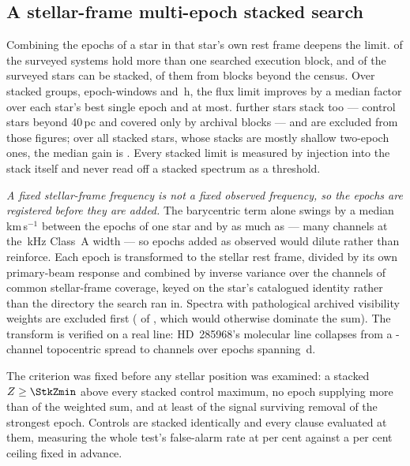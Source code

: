 \subsection{A stellar-frame multi-epoch stacked search}
\label{sec:stack}

Combining the epochs of a star in that star's own rest frame deepens the
limit. \EpMulti{} of the \NSystems{} surveyed systems hold more than one
searched execution block, and \SxStkStarCensus{} of the surveyed stars can be
stacked, \SttNStkOneEb{} of them from blocks beyond the census. Over
\SyStkNGroup{} stacked groups, \SyStkNEpochComb{} epoch-windows and
\SyStkHours\,h, the flux limit improves by a median factor \SyStkGainMed{}
over each star's best single epoch and \SyStkGainMax{} at most.
\SxStkStarOutside{} further stars stack too --- \SyStkStarOos{} control stars
beyond 40\,pc and \SyStkStarOther{} covered only by archival blocks --- and are
excluded from those figures; over all \StkNStar{} stacked stars, whose stacks
are mostly shallow two-epoch ones, the median gain is \StkLimitGainMed. Every
stacked limit is measured by injection into the stack itself and never read
off a stacked spectrum as a threshold.

\emph{A fixed stellar-frame frequency is not a fixed observed frequency, so
the epochs are registered before they are added.} The barycentric term alone
swings by a median \StkVcorrSwingMed\,km\,s$^{-1}$ between the epochs of one
star and by as much as \StkVcorrSwingMax{} --- many channels at the
\StkRefChanKHz\,kHz Class~A width --- so epochs added as observed would dilute
rather than reinforce. Each epoch is transformed to the stellar rest frame,
divided by its own primary-beam response and combined by inverse variance
over the channels of common stellar-frame coverage, keyed on the star's
catalogued identity rather than the directory the search ran in. Spectra with
pathological archived visibility weights are excluded first
(\StkBadWeight{} of \StkNProd, which would otherwise dominate the sum). The transform is verified on a real line: HD~285968's molecular
line collapses from a \StkRegTopoChan-channel topocentric spread to
\StkRegStellarChan{} channels over \StkRegNEpoch{} epochs spanning
\StkRegSpanD\,d.

The criterion was fixed before any stellar position was examined: a stacked
$Z\ge\StkZmin$ above every stacked control maximum, no epoch supplying more
than \StkDomMax{} of the weighted sum, and at least \StkJkMin{} of the signal
surviving removal of the strongest epoch. Controls are stacked identically
and every clause evaluated at them, measuring the whole test's
false-alarm rate at \StkCtrlFap{} per cent against a \StkFapCeil{} per cent
ceiling fixed in advance.

